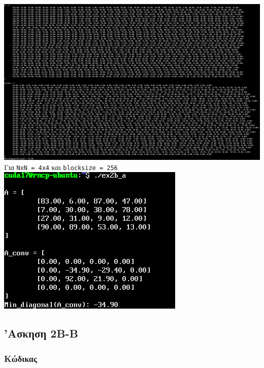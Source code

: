 \documentclass{article}
\begin{document}
\includegraphics[width=\textwidth]{res/ex2b_a_2.png} \\

Για \lstinline{NxN = 4x4} και \lstinline{blocksize = 256} \\

\includegraphics[width=\textwidth]{res/ex2b_a_3.png} \\
\pagebreak

\subsection{'Ασκηση 2Β-Β}

\subsubsection{Κώδικας}

\pagebreak
\end{document}
